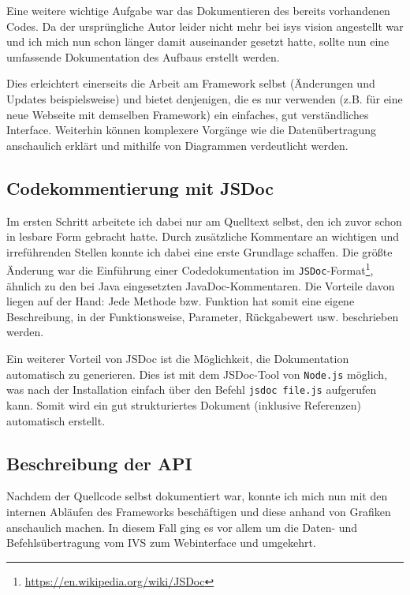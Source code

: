 \documentclass[xcolor=dvipsnames,11pt,paper=a4paper]{report}
\begin{document}
Eine weitere wichtige Aufgabe war das Dokumentieren des bereits vorhandenen Codes.
Da der ursprüngliche Autor leider nicht mehr bei isys vision angestellt war und
ich mich nun schon länger damit auseinander gesetzt hatte, sollte nun eine umfassende
Dokumentation des Aufbaus erstellt werden.

Dies erleichtert einerseits die Arbeit am Framework selbst (Änderungen und Updates
beispielsweise) und bietet denjenigen, die es nur verwenden (z.B. für eine neue
Webseite mit demselben Framework) ein einfaches, gut verständliches Interface. Weiterhin
können komplexere Vorgänge wie die Datenübertragung anschaulich erklärt und mithilfe
von Diagrammen verdeutlicht werden.


\subsection{Codekommentierung mit JSDoc}
\label{subsec:ivs-dokumentation-jsdoc}

Im ersten Schritt arbeitete ich dabei nur am Quelltext selbst, den ich zuvor schon
in lesbare Form gebracht hatte. Durch zusätzliche Kommentare an wichtigen und irreführenden
Stellen konnte ich dabei eine erste Grundlage schaffen. Die größte Änderung war
die Einführung einer Codedokumentation im \texttt{JSDoc}-Format\footnote{\url{https://en.wikipedia.org/wiki/JSDoc}},
ähnlich zu den bei Java eingesetzten JavaDoc-Kommentaren. Die Vorteile davon liegen
auf der Hand: Jede Methode bzw. Funktion hat somit eine eigene Beschreibung, in
der Funktionsweise, Parameter, Rückgabewert usw. beschrieben werden.

Ein weiterer Vorteil von JSDoc ist die Möglichkeit, die Dokumentation automatisch
zu generieren. Dies ist mit dem JSDoc-Tool von \texttt{Node.js} möglich, was nach
der Installation einfach über den Befehl \texttt{jsdoc file.js} aufgerufen kann.
Somit wird ein gut strukturiertes Dokument (inklusive Referenzen) automatisch erstellt.


\subsection{Beschreibung der API}
\label{subsec:ivs-dokumentation-beschreibung}

Nachdem der Quellcode selbst dokumentiert war, konnte ich mich nun mit den internen
Abläufen des Frameworks beschäftigen und diese anhand von Grafiken anschaulich machen.
In diesem Fall ging es vor allem um die Daten- und Befehlsübertragung vom IVS zum
Webinterface und umgekehrt.
\end{document}

